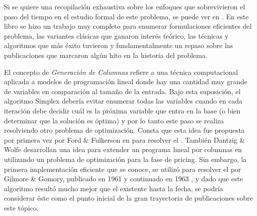 Si se quiere una recopilación exhaustiva sobre los enfoques que sobrevivieron el paso del tiempo en el estudio formal de este problema, se puede ver en \cite{toth-vigo}. En este libro se hizo un trabajo muy completo para enumerar formulaciones eficientes del problema, las variantes clásicas que ganaron interés teórico, las técnicas y algoritmos que más éxito tuvieron y fundamentalmente un repaso sobre las publicaciones que marcaron algún hito en la historia del problema.

El concepto de \emph{Generación de Columnas} refiere a una técnica computacional aplicada a modelos de programación lineal donde hay una cantidad muy grande de variables en comparación al tamaño de la entrada. Bajo esta suposición, el algoritmo Simplex debería evitar enumerar todas las variables cuando en cada iteración debe decidir cuál es la próxima variable que entra en la base (o bien determinar que la solución es óptima) y por lo tanto este paso se realiza resolviendo otro problema de optimización. Consta que esta idea fue propuesta por primera vez por Ford \& Fulkerson en \cite{ford-fulkerson} para resolver el . También Dantzig \& Wolfe desarrollan una idea para extender un programa lineal por columnas en \cite{dantzig-wolfe} utilizando un problema de optimización para la fase de pricing. Sin embargo, la primera implementación eficiente que se conoce, se utilizó para resolver el  por Gilmore \& Gomory, publicado en 1961 \cite{gilmore-gomory1} y continuado en 1963 \cite{gilmore-gomory2}, y dado que este algoritmo resultó mucho mejor que el existente hasta la fecha, se podría considerar éste como el punto inicial de la gran trayectoria de publicaciones sobre este tópico. 

